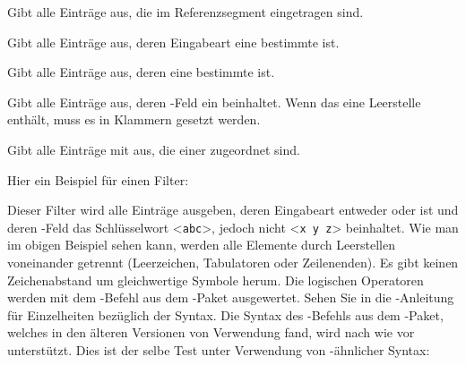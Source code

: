 \documentclass{ltxdockit}[2011/03/25]
\begin{document}
\begin{optionlist*}


Gibt alle Einträge aus, die im Referenzsegment  eingetragen sind.


Gibt alle Einträge aus, deren Eingabeart eine bestimmte  ist.


Gibt alle Einträge aus, deren  eine bestimmte
 ist.


Gibt alle Einträge aus, deren -Feld ein 
beinhaltet. Wenn das  eine Leerstelle enthält, muss es in Klammern
gesetzt werden.


Gibt alle Einträge mit  aus, die einer 
zugeordnet sind.

\end{optionlist*}

Hier ein Beispiel für einen Filter:

\begin{ltxexample}[style=latex,keywords={and,or,not,type,keyword}]{}
\end{ltxexample}
%

Dieser Filter wird alle Einträge ausgeben, deren Eingabeart entweder
 oder  ist und deren -Feld das
Schlüsselwort <\texttt{abc}>, jedoch nicht <\texttt{x y z}> beinhaltet. Wie man
im obigen Beispiel sehen kann, werden alle Elemente durch Leerstellen
voneinander getrennt (Leerzeichen, Tabulatoren oder Zeilenenden). Es gibt keinen
Zeichenabstand um gleichwertige Symbole herum. Die logischen Operatoren werden
mit dem -Befehl aus dem -Paket ausgewertet. Sehen Sie in die
-Anleitung für Einzelheiten bezüglich der Syntax. Die Syntax des
-Befehls aus dem -Paket, welches in den älteren
Versionen von  Verwendung fand, wird nach wie vor unterstützt. Dies
ist der selbe Test unter Verwendung von -ähnlicher Syntax:

\begin{ltxexample}[style=ifthen,morekeywords={\\type,\\keyword}]{}
\end{ltxexample}
%
\end{document}
